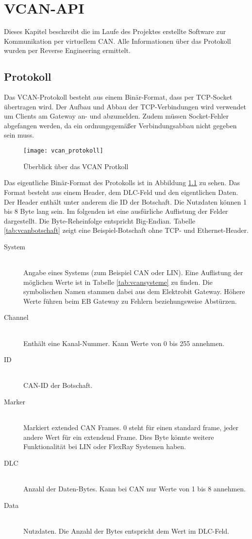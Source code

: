 \chapter{VCAN-API}
\label{sec:vcan_api}
Dieses Kapitel beschreibt die im Laufe des Projektes erstellte Software zur Kommunikation per virtuellem CAN. Alle Informationen über das Protokoll wurden per Reverse Engineering ermittelt.


\section{Protokoll}
\label{sec:vcan_protokoll}
Das VCAN-Protokoll besteht aus einem Binär-Format, dass per TCP-Socket übertragen wird. Der Aufbau und Abbau der TCP-Verbindungen wird verwendet um Clients am Gateway an- und abzumelden. Zudem müssen Socket-Fehler abgefangen werden, da ein ordnungsgemäßer Verbindungsabbau nicht gegeben sein muss.

\begin{figure}[ht]
\centering
\texttt{[image: vcan\_protokoll]}
\caption{Überblick über das VCAN Protkoll}
\label{fig:vcan_protokoll}
\end{figure}

Das eigentliche Binär-Format des Protokolls ist in Abbildung \ref{fig:vcan_protokoll} zu sehen. Das Format besteht aus einem Header, dem DLC-Feld und den eigentlichen Daten. Der Header enthält unter anderem die ID der Botschaft. Die Nutzdaten können 1 bis 8 Byte lang sein. Im folgenden ist eine ausfürliche Auflistung der Felder dargestellt. Die Byte-Reheinfolge entspricht Big-Endian. Tabelle \ref{tab:vcanbotschaft} zeigt eine Beispiel-Botschaft ohne TCP- und Ethernet-Header.

\begin{description}
    \item[System] \hfill \\ Angabe eines Systems (zum Beispiel CAN oder LIN). Eine Auflistung der möglichen Werte ist in Tabelle \ref{tab:vcansysteme} zu finden. Die symbolischen Namen stammen dabei aus dem Elektrobit Gateway. Höhere Werte führen beim EB Gateway zu Fehlern beziehungsweise Abstürzen.
    \item[Channel] \hfill \\ Enthält eine Kanal-Nummer. Kann Werte von 0 bis 255 annehmen.
    \item[ID] \hfill \\ CAN-ID der Botschaft.
    \item[Marker] \hfill \\ Markiert extended CAN Frames. 0 steht für einen standard frame, jeder andere Wert für ein extendend Frame. Dies Byte könnte weitere Funktionalität bei LIN oder FlexRay Systemen haben.
    \item[DLC] \hfill \\ Anzahl der Daten-Bytes. Kann bei CAN nur Werte von 1 bis 8 annehmen. 
    \item[Data] \hfill \\ Nutzdaten. Die Anzahl der Bytes entspricht dem Wert im DLC-Feld.
\end{description}

